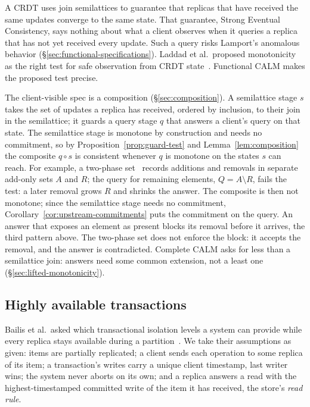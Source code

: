 \documentclass[sigconf]{cidr-2027}
\theoremstyle{remark}
\newcommand{\commitment}{commitment\xspace}
\begin{document}
A CRDT uses join semilattices to guarantee that replicas that have received
the same updates converge to the same state.  That guarantee, Strong Eventual
Consistency, says nothing about what a client observes when it queries a
replica that has not yet received every update.  Such a query risks Lamport's anomalous behavior
(\S\ref{sec:functional-specifications}).  Laddad et al.\ proposed
monotonicity as the right test for safe observation from CRDT
state~\cite{laddad2022keep}.  Functional CALM makes the proposed test precise.

The client-visible spec is a composition (\S\ref{sec:composition}).  A semilattice
stage $s$ takes the set of updates a replica has received, ordered by
inclusion, to their join in the semilattice; it guards a query stage $q$ that
answers a client's query on that state.  The semilattice stage is monotone by
construction and needs no \commitment, so by Proposition~\ref{prop:guard-test}
and Lemma~\ref{lem:composition} the composite $q\circ s$ is consistent whenever
$q$ is monotone on the states $s$ can reach.  For example, a two-phase
set~\cite{shapiro2011crdt} records additions and removals in separate add-only
sets $A$ and $R$; the query for remaining elements, $Q=A\setminus R$, fails the
test: a later removal grows $R$ and shrinks the answer.
The composite is then not monotone; since the semilattice stage needs no
\commitment, Corollary~\ref{cor:upstream-commitments} puts the \commitment on
the query. An
answer that exposes an element as present blocks its removal before it arrives,
the third pattern above.  The two-phase set does not enforce the block: it
accepts the removal, and the answer is contradicted.  Complete CALM asks for
less than a semilattice join: answers need some common extension, not a least one
(\S\ref{sec:lifted-monotonicity}).

\subsection{Highly available transactions}
\label{sec:hat-instance}

Bailis et al.\ asked which transactional isolation levels a system can provide
while every replica stays available during a partition~\cite{bailis2013hat}.
We take their assumptions as given:
items are partially replicated; a client sends each operation to some replica
of its item; a transaction's writes carry a unique client timestamp, last
writer wins; the system never aborts on its own; and a replica answers a read
with the highest-timestamped committed write of the item it has received, the
store's \emph{read rule}.
\end{document}
